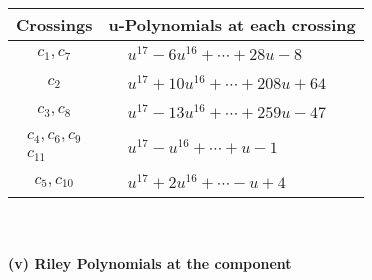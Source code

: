 \documentclass[1p]{elsarticle_modified}
\theoremstyle{definition}
\begin{document}
\begin{tabular}{m{50pt}|m{274pt}}
Crossings & \hspace{64pt}u-Polynomials at each crossing \\
\hline $$\begin{aligned}c_{1},c_{7}\end{aligned}$$&$\begin{aligned}
&u^{17}-6 u^{16}+\cdots+28 u-8
\end{aligned}$\\
\hline $$\begin{aligned}c_{2}\end{aligned}$$&$\begin{aligned}
&u^{17}+10 u^{16}+\cdots+208 u+64
\end{aligned}$\\
\hline $$\begin{aligned}c_{3},c_{8}\end{aligned}$$&$\begin{aligned}
&u^{17}-13 u^{16}+\cdots+259 u-47
\end{aligned}$\\
\hline $$\begin{aligned}c_{4},c_{6},c_{9}\\c_{11}\end{aligned}$$&$\begin{aligned}
&u^{17}- u^{16}+\cdots+u-1
\end{aligned}$\\
\hline $$\begin{aligned}c_{5},c_{10}\end{aligned}$$&$\begin{aligned}
&u^{17}+2 u^{16}+\cdots- u+4
\end{aligned}$\\
\hline
\end{tabular}\\~\\
\newpage\renewcommand{\arraystretch}{1}
\flushleft \textbf{(v) Riley Polynomials at the component}\newline \\
\end{document}
